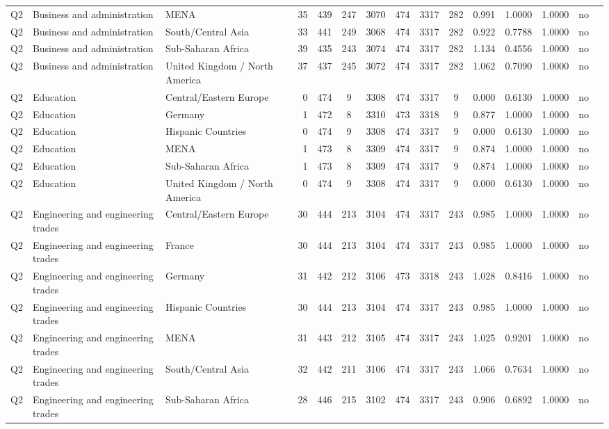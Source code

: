\begin{longtable}{lllrcccccccccll}
Q2 & Business and administration & MENA & 35 & 439 & 247 & 3070 & 474 & 3317 & 282 & 0.991 & 1.0000 & 1.0000 & no \\
Q2 & Business and administration & South/Central Asia & 33 & 441 & 249 & 3068 & 474 & 3317 & 282 & 0.922 & 0.7788 & 1.0000 & no \\
Q2 & Business and administration & Sub-Saharan Africa & 39 & 435 & 243 & 3074 & 474 & 3317 & 282 & 1.134 & 0.4556 & 1.0000 & no \\
Q2 & Business and administration & United Kingdom / North America & 37 & 437 & 245 & 3072 & 474 & 3317 & 282 & 1.062 & 0.7090 & 1.0000 & no \\
Q2 & Education & Central/Eastern Europe & 0 & 474 & 9 & 3308 & 474 & 3317 & 9 & 0.000 & 0.6130 & 1.0000 & no \\
Q2 & Education & Germany & 1 & 472 & 8 & 3310 & 473 & 3318 & 9 & 0.877 & 1.0000 & 1.0000 & no \\
Q2 & Education & Hispanic Countries & 0 & 474 & 9 & 3308 & 474 & 3317 & 9 & 0.000 & 0.6130 & 1.0000 & no \\
Q2 & Education & MENA & 1 & 473 & 8 & 3309 & 474 & 3317 & 9 & 0.874 & 1.0000 & 1.0000 & no \\
Q2 & Education & Sub-Saharan Africa & 1 & 473 & 8 & 3309 & 474 & 3317 & 9 & 0.874 & 1.0000 & 1.0000 & no \\
Q2 & Education & United Kingdom / North America & 0 & 474 & 9 & 3308 & 474 & 3317 & 9 & 0.000 & 0.6130 & 1.0000 & no \\
Q2 & Engineering and engineering trades & Central/Eastern Europe & 30 & 444 & 213 & 3104 & 474 & 3317 & 243 & 0.985 & 1.0000 & 1.0000 & no \\
Q2 & Engineering and engineering trades & France & 30 & 444 & 213 & 3104 & 474 & 3317 & 243 & 0.985 & 1.0000 & 1.0000 & no \\
Q2 & Engineering and engineering trades & Germany & 31 & 442 & 212 & 3106 & 473 & 3318 & 243 & 1.028 & 0.8416 & 1.0000 & no \\
Q2 & Engineering and engineering trades & Hispanic Countries & 30 & 444 & 213 & 3104 & 474 & 3317 & 243 & 0.985 & 1.0000 & 1.0000 & no \\
Q2 & Engineering and engineering trades & MENA & 31 & 443 & 212 & 3105 & 474 & 3317 & 243 & 1.025 & 0.9201 & 1.0000 & no \\
Q2 & Engineering and engineering trades & South/Central Asia & 32 & 442 & 211 & 3106 & 474 & 3317 & 243 & 1.066 & 0.7634 & 1.0000 & no \\
Q2 & Engineering and engineering trades & Sub-Saharan Africa & 28 & 446 & 215 & 3102 & 474 & 3317 & 243 & 0.906 & 0.6892 & 1.0000 & no \\

\end{longtable}
